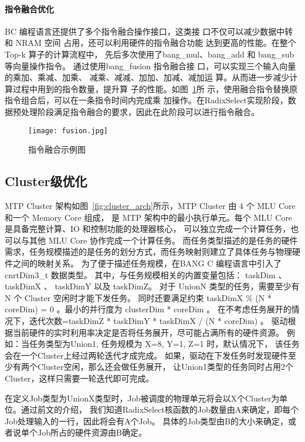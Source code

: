 \paragraph{指令融合优化}
BC 编程语言还提供了多个指令融合操作接口，这类接 口不仅可以减少数据中转和 NRAM 空间
占用，还可以利用硬件的指令融合功能 达到更高的性能。在整个 Top-k 算子的计算流程中，
先后多次使用了bang\_mul、bang\_add 和 bang\_sub 等向量操作指令。
通过使用bang\_fusion 指令融合接 口，可以实现三个输入向量的乘加、乘减、加乘、
减乘、减减、加加、加减、减加运 算。从而进一步减少计算过程中用到的指令数量，提升算
子的性能。如图~\ref{fig:fusion}所 示，使用融合指令替换原指令组合后，可以在一条指令时间内完成乘
加操作。在RadixSelect实现阶段，数据预处理阶段满足指令融合的要求，因此在此阶段可以进行指令融合。
\begin{figure}[ht]
    \centering
    \texttt{[image: fusion.jpg]}
    \caption{指令融合示例图}
    \label{fig:fusion}
\end{figure}



\subsection{Cluster级优化}
MTP Cluster 架构如图~\ref{fig:cluster_arch}所示，MTP Cluster 由 4 个 MLU Core 和一个 Memory Core 组成，
是 MTP 架构中的最小执行单元。每个 MLU Core 是具备完整计算、IO 和控制功能的处理器核心，
可以独立完成一个计算任务，也可以与其他 MLU Core 协作完成一个计算任务。
而任务类型描述的是任务的硬件需求，任务规模描述的是任务的划分方式，而任务映射则建立了具体任务与物理硬件之间的映射关系。
为了便于描述任务规模，在BANG C 编程语言中引入了cnrtDim3\_t 数据类型。
其中，与任务规模相关的内置变量包括： taskDim 、 taskDimX 、 taskDimY 以及 taskDimZ。
对于 UnionN 类型的任务，需要至少有 N 个 Cluster 空闲时才能下发任务。
同时还要满足约束 taskDimX \% (N * coreDim) = 0 。最小的并行度为 clusterDim * coreDim 。
在不考虑任务展开的情况下，迭代次数=taskDimZ * taskDimY * taskDimX / (N * coreDim) 。
驱动根据当前硬件的实时利用率决定是否将任务展开，尽可能占满所有的硬件资源。
例如：当任务类型为Union1, 任务规模为 {X=8, Y=1, Z=1} 时，默认情况下，
该任务会在一个Cluster上经过两轮迭代才成完成。
如果，驱动在下发任务时发现硬件至少有两个Cluster空闲，那么还会做任务展开，
让Union1类型的任务同时占用2个Cluster，这样只需要一轮迭代即可完成。

在定义Job类型为UnionX类型时，Job被调度的物理单元将会以X个Cluster为单位。通过前文的介绍，
我们知道RadixSelect核函数的Job数量由A来确定，即每个Job处理输入的一行，因此将会有A个Job。
具体的Job类型由B的大小来确定，或者说单个Job所占的硬件资源由B确定。

